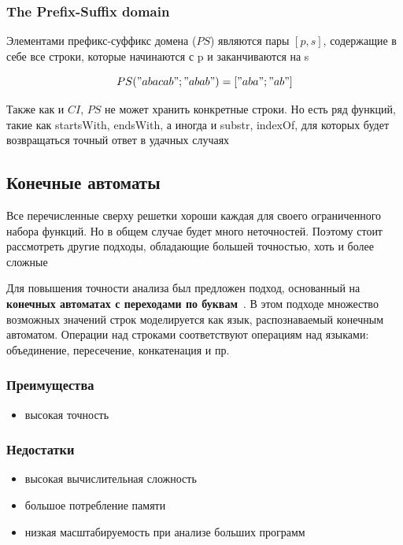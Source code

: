 \subsubsection*{The Prefix-Suffix domain}
Элементами префикс-суффикс домена ($PS$) являются пары $[p, s]$, содержащие в себе все строки, которые начинаются с p и заканчиваются на s

\[PS("abacab"; "abab") = ["aba"; "ab"]\]

Также как и $CI$, $PS$ не может хранить конкретные строки. Но есть ряд функций, такие как startsWith, endsWith, а иногда и substr, indexOf, для которых будет возвращаться точный ответ в удачных случаях\\

\newpage
\subsection{Конечные автоматы}
Все перечисленные сверху решетки хороши каждая для своего ограниченного набора функций. Но в общем случае будет много неточностей. Поэтому стоит рассмотреть другие подходы, обладающие большей точностью, хоть и более сложные

Для повышения точности анализа был предложен подход, основанный на \textbf{конечных автоматах с переходами по буквам}~\cite{apinis2020symbolic}. В этом подходе множество возможных значений строк моделируется как язык, распознаваемый конечным автоматом. Операции над строками соответствуют операциям над языками: объединение, пересечение, конкатенация и пр.

\subsubsection*{Преимущества}
\begin{itemize}
    \item высокая точность
\end{itemize}

\subsubsection*{Недостатки}
\begin{itemize}
    \item высокая вычислительная сложность
    \item большое потребление памяти
    \item низкая масштабируемость при анализе больших программ
\end{itemize}

